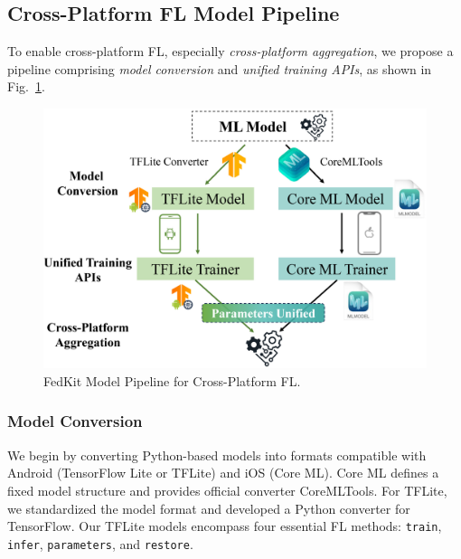 \documentclass[letterpaper]{article} %
\begin{document}
\subsection{Cross-Platform FL Model Pipeline}

To enable cross-platform FL,
especially \textit{cross-platform aggregation},
we propose a pipeline comprising
\textit{model conversion} and
\textit{unified training APIs},
as shown in Fig.~\ref{cross_fl}.

\begin{figure}
    \centering
    \includegraphics*[width=\linewidth]{cross_smart_fl_workflow.pdf}
    \caption{FedKit Model Pipeline for Cross-Platform FL.}
    \label{cross_fl}
\end{figure}

\subsubsection{Model Conversion}
We begin by converting Python-based models into formats compatible with
Android (TensorFlow Lite or TFLite) and iOS (Core ML).
Core ML defines a fixed model structure and provides
official converter CoreMLTools.
For TFLite, we standardized the model format and
developed a Python converter for TensorFlow.
Our TFLite models encompass four essential FL methods:
\lstinline{train}, \lstinline{infer}, \lstinline{parameters},
and \lstinline{restore}.
\end{document}
